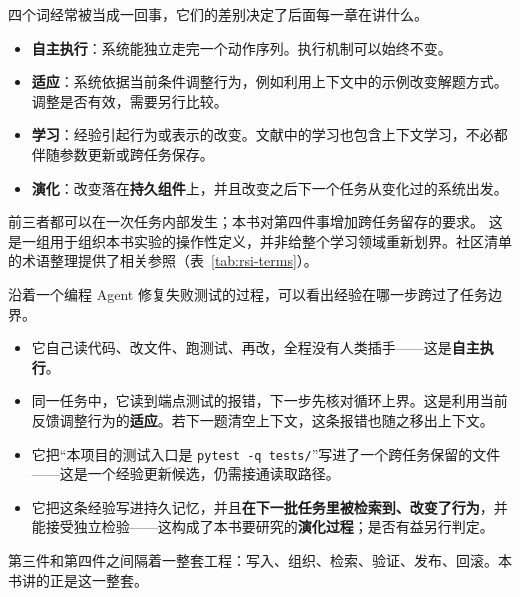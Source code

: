 四个词经常被当成一回事，它们的差别决定了后面每一章在讲什么。

\begin{itemize}
  \item \textbf{自主执行}：系统能独立走完一个动作序列。执行机制可以始终不变。
  \item \textbf{适应}：系统依据当前条件调整行为，例如利用上下文中的示例改变解题方式。调整是否有效，需要另行比较。
  \item \textbf{学习}：经验引起行为或表示的改变。文献中的学习也包含上下文学习，不必都伴随参数更新或跨任务保存。
  \item \textbf{演化}：改变落在\textbf{持久组件}上，并且改变之后下一个任务从变化过的系统出发。
\end{itemize}

前三者都可以在一次任务内部发生；本书对第四件事增加跨任务留存的要求。
这是一组用于组织本书实验的操作性定义，并非给整个学习领域重新划界。社区清单的术语整理提供了相关参照（表~\ref{tab:rsi-terms}）\cite{awesome-rsi}。

沿着一个编程 Agent 修复失败测试的过程，可以看出经验在哪一步跨过了任务边界。

\begin{itemize}
  \item 它自己读代码、改文件、跑测试、再改，全程没有人类插手——这是\textbf{自主执行}。
  \item 同一任务中，它读到端点测试的报错，下一步先核对循环上界。这是利用当前反馈调整行为的\textbf{适应}。若下一题清空上下文，这条报错也随之移出上下文。
  \item 它把“本项目的测试入口是 \texttt{pytest -q tests/}”写进了一个跨任务保留的文件——这是一个经验更新候选，仍需接通读取路径。
  \item 它把这条经验写进持久记忆，并且\textbf{在下一批任务里被检索到、改变了行为}，并能接受独立检验——这构成了本书要研究的\textbf{演化过程}；是否有益另行判定。
\end{itemize}

第三件和第四件之间隔着一整套工程：写入、组织、检索、验证、发布、回滚。本书讲的正是这一整套。

